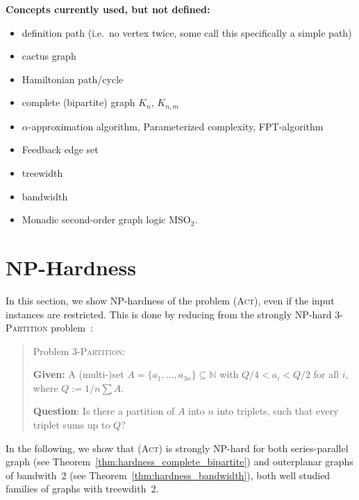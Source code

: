 \documentclass[runningheads]{llncs}
\numberwithin{equation}{section}
\newcommand{\N}{\mathbb{N}}
\newcommand{\set}[1]{\{ #1 \}}
\newcommand{\act}{\textsc{(Act)}}
\begin{document}
\textbf{ Concepts currently used, but not defined: }
\begin{itemize}
\item definition path (i.e.\ no vertex twice, some call this specifically a simple path)
\item cactus graph
\item Hamiltonian path/cycle
\item complete (bipartite) graph $K_n$, $K_{n,m}$
\item $\alpha$-approximation algorithm, Parameterized complexity, FPT-algorithm
\item Feedback edge set
\item treewidth
\item bandwidth
\item Monadic second-order graph logic $\text{MSO}_2$.
\end{itemize}

\section{NP-Hardness}
\label{sec:hardness}

In this section, we show NP-hardness of the problem {\act}, even if the input instances are restricted. 
This is done by reducing from the strongly NP-hard \textsc{3-Partition} problem~\cite{garey1979computers}: 


\begin{quote}

Problem \textsc{3-Partition}: 

\textbf{Given:} A (multi-)set $A = \set{a_1, \ldots, a_{3n}} \subseteq \N$ with $Q/4 < a_i < Q/2$ for all $i$, where $Q := 1/n \sum A$. 

\textbf{Question}: Is there a partition of $A$ into $n$ into triplets, such that every triplet sums up to $Q$?

\end{quote}

In the following, we show that {\act} is strongly NP-hard for both series-parallel graph (see Theorem~\ref{thm:hardness_complete_bipartite}) and 
outerplanar graphs of bandwith~2 (see Theorem~\ref{thm:hardness_bandwidth}), both well studied families of 
graphs with treewdith~2.
\end{document}
